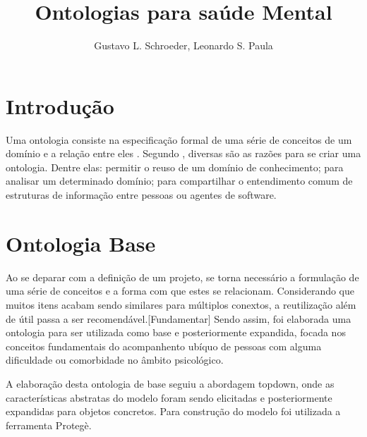 \documentclass[12pt]{article}
\title{Ontologias para saúde Mental}
\author{Gustavo L. Schroeder\inst{1}, Leonardo S. Paula\inst{1}}
\begin{document}
 

\maketitle

\begin{abstract}
  
\end{abstract}
     
\begin{resumo} 
  
\end{resumo}


\section{Introdução}

Uma ontologia consiste na especificação formal de uma série de conceitos de um domínio e a relação entre eles \cite{GRUBER1993199}. Segundo \cite{Noy01ontologydevelopment}, diversas são as razões para se criar uma ontologia. Dentre elas: permitir o reuso de um domínio de conhecimento; para analisar um determinado domínio; para compartilhar o entendimento comum de estruturas de informação entre pessoas ou agentes de software. 


\section{Ontologia Base} \label{sec:baseOntology}

Ao se deparar com a definição de um projeto, se torna necessário a formulação de uma série de conceitos e a forma com que estes se relacionam.
Considerando que muitos itens acabam sendo similares para múltiplos conextos, a reutilização além de útil passa a ser recomendável.[Fundamentar]
Sendo assim, foi elaborada uma ontologia para ser utilizada como base e posteriormente expandida, focada nos conceitos fundamentais do acompanhento ubíquo de pessoas com alguma dificuldade ou comorbidade no âmbito psicológico.

A elaboração desta ontologia de base seguiu a abordagem topdown, onde as características abstratas do modelo foram sendo elicitadas e posteriormente expandidas para objetos concretos. Para construção do modelo foi utilizada a ferramenta Protegè.
\end{document}
